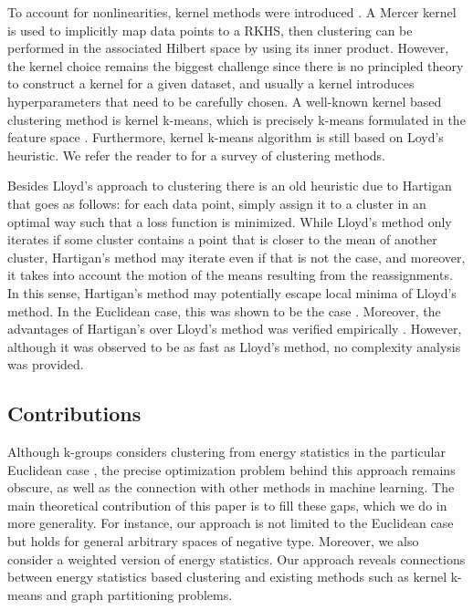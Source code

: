 \documentclass[10pt,journal,compsoc]{IEEEtran}
\begin{document}
To account for nonlinearities, kernel methods were introduced 
\cite{Smola,Girolami}. A Mercer kernel \cite{Mercer} is used to implicitly
map data points to a RKHS, then clustering can be performed in the associated
Hilbert space by using its inner product. However, the kernel choice remains 
the biggest challenge since there is no principled theory to construct a kernel
for a given dataset, and usually a kernel introduces hyperparameters that 
need to be carefully chosen. A well-known kernel based clustering method
is kernel k-means, which is precisely k-means 
formulated in the feature space \cite{Girolami}. 
Furthermore, kernel k-means algorithm
\cite{Dhillon2,Dhillon} is still based on Loyd's heuristic.
We refer the reader to \cite{Filippone} for a survey of clustering
methods.

Besides Lloyd's approach to clustering %
there is an old heuristic
due to Hartigan \cite{Hartigan1975,Hartigan1979} that
goes as follows: for each data point, simply assign it to a cluster
in an optimal way such that a loss function is minimized.
While Lloyd's method only iterates if some cluster contains a point
that is closer to the mean of another cluster, Hartigan's method may iterate
even if that is not the case, and moreover, it takes into account the motion
of the means resulting from the reassignments. In this sense, Hartigan's
method may potentially escape local minima of Lloyd's method.
In the Euclidean case, this was shown to be the case \cite{Telgarsky}.
Moreover, the advantages of Hartigan's over Lloyd's method was verified
empirically \cite{Telgarsky,Slonin}. However, 
although it was observed to be as fast as Lloyd's method, no complexity
analysis was provided. 


\subsection*{Contributions}
Although k-groups considers clustering from energy statistics
in the particular Euclidean case \cite{Kgroups},
the precise optimization problem behind this approach
remains obscure, as well as the connection with other methods
in machine learning.
The main theoretical contribution of this paper is to fill these gaps, 
which 
we do in  more generality. For instance, our approach is not limited
to the Euclidean case but holds for general arbitrary spaces
of negative type. 
Moreover, we also
consider a weighted version of energy statistics.
Our approach reveals connections
between energy statistics based clustering and existing methods
such as kernel k-means and graph partitioning problems.
\end{document}
